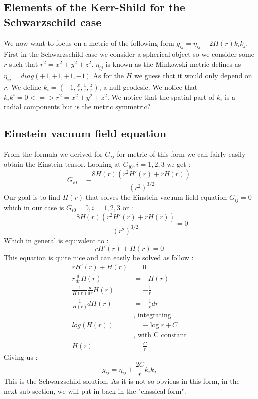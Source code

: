 \documentclass[a4paper,12pt]{article}
\theoremstyle{definition}
\begin{document}
\subsection{Elements of the Kerr-Shild for the Schwarzschild case}
We now want to focus on a metric of the following form $g_{ij}=\eta_{ij}+2H(r)k_ik_j$.
First in the Schwarzschild case we consider a spherical object so we consider some $r$ such that $r^2=x^2+y^2+z^2$.
$\eta_{ij}$ is known as the Minkowski metric defines as $\eta_{ij}=diag(+1,+1,+1,-1)$
As for the $H$ we guess that it would only depend on $r$.
We define $k_i=(-1,\frac{x}{r},\frac{y}{r},\frac{z}{r})$, a null geodesic.
We notice that $k_ik^i=0 <=> r^2=x^2+y^2+z^2$.
We notice that the spatial part of $k_i$ is a radial components but is the metric symmetric?
\subsection{Einstein vacuum field equation}
From the formula we derived for $G_{ij}$ for metric of this form we can fairly easily obtain the Einstein tensor.
Looking at $G_{i0}, i=1,2,3$ we get :
\begin{equation}
	G_{i0}=-\frac{8 H(r) (r^2 H'(r)+rH(r))}{(r^2)^{3/2}}
\end{equation}
Our goal is to find $H(r)$ that solves the Einstein vacuum field equation $G_{ij}=0$ which in our case is $G_{i0}=0, i=1,2,3$ or :
\begin{equation}
	-\frac{8 H(r) (r^2 H'(r)+rH(r))}{(r^2)^{3/2}}=0
\end{equation}
Which in general is equivalent to :
\begin{equation}
	rH'(r)+H(r)=0
\end{equation}
This equation is quite nice and can easily be solved as follow :
\begin{align}
	rH'(r)+H(r)&=0\\
	r\frac{d}{dr}H(r)&=-H(r)\\
	\frac{1}{H(r)}\frac{d}{dr}H(r)&=-\frac{1}{r}\\
	\frac{1}{H(r)}dH(r)&=-\frac{1}{r}dr \;\\
	&\text{, integrating,}\\
	log(H(r))&=-\log{r}+C \;\\
	&\text{, with C constant}\\
	H(r)&=\frac{C}{r}
\end{align}
Giving us :
\begin{equation}
	g_{ij}=\eta_{ij}+\frac{2C}{r}k_ik_j
\end{equation}
This is the Schwarzschild solution. As it is not so obvious in this form, in the next sub-section, we will put in back in the "classical form".
\end{document}
